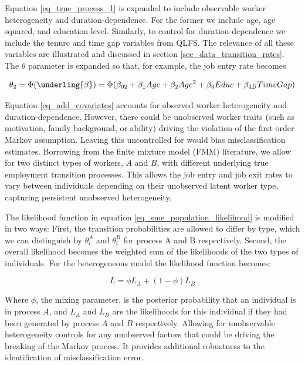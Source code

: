\documentclass[letterpaper,12pt,final,dvipsnames]{article}
\begin{document}
Equation \ref{eq_true_process_1} is expanded to include observable worker heterogeneity and duration-dependence. For the former we include age, age squared, and education level. Similarly, to control for duration-dependence we include the tenure and time gap variables from QLFS. The relevance of all these variables are illustrated and discussed in section \ref{sec_data_transition_rates}. The $\theta$ parameter is expanded so that, for example, the job entry rate becomes

\begin{equation} \label{eq_add_covariates}
\theta_{2} = \Phi(\underling{\beta}) = \Phi(\beta_{02} + \beta_{1} Age + \beta_{2} Age^2 + \beta_3 Educ + \beta_{4B} TimeGap)
\end{equation}

Equation \ref{eq_add_covariates} accounts for observed worker heterogeneity and duration-dependence. However, there could be unobserved worker traits (such as motivation, family background, or ability) driving the violation of the first-order Markov assumption. Leaving this uncontrolled for would bias misclassification estimates. Borrowing from the finite mixture model (FMM) literature, we allow for two distinct types of workers, $A$ and $B$, with different underlying true employment transition processes. This allows the job entry and job exit rates to vary between individuals depending on their unobserved latent worker type, capturing persistent unobserved heterogeneity. 

The likelihood function in equation \ref{eq_sme_population_likelihood} is modified in two ways: First, the transition probabilities are allowed to differ by type, which we can distinguish by $\theta_{i}^A$ and $\theta_{i}^B$ for process A and B respectively. Second, the overall likelihood becomes the weighted sum of the likelihoods of the two types of individuals. For the heterogeneous model the likelihood function becomes:

\begin{equation} \label{eq_fmm_likelihood}
L = \phi L_A + (1-\phi)L_B
\end{equation}

Where $\phi$, the mixing parameter, is the posterior probability that an individual is in process $A$, and $L_A$ and $L_B$ are the likelihoods for this individual if they had been generated by process $A$ and $B$ respectively. Allowing for unobservable heterogeneity controls for any unobserved factors that could be driving the breaking of the Markov process. It provides additional robustness to the identification of misclassification error.
\end{document}
